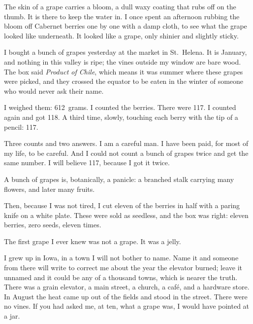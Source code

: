 \bigskip

The skin of a grape carries a bloom, a dull waxy coating that rubs off on
the thumb. It is there to keep the water in. I once spent an afternoon
rubbing the bloom off Cabernet berries one by one with a damp cloth, to see
what the grape looked like underneath. It looked like a grape, only shinier
and slightly sticky.

I bought a bunch of grapes yesterday at the market in St.~Helena. It is
January, and nothing in this valley is ripe; the vines outside my window are
bare wood. The box said \emph{Product of Chile}, which means it was summer
where these grapes were picked, and they crossed the equator to be eaten in
the winter of someone who would never ask their name.%

I weighed them: 612~grams. I counted the berries. There were 117. I counted
again and got 118. A third time, slowly, touching each berry with the tip of
a pencil: 117.

Three counts and two answers. I am a careful man. I have
been paid, for most of my life, to be careful. And I could not count a bunch
of grapes twice and get the same number. I will believe 117, because I got
it twice.

A bunch of grapes is, botanically, a panicle: a branched stalk carrying
many flowers, and later many fruits.%

Then, because I was not tired, I cut eleven of the berries in half with a
paring knife on a white plate. These were sold as seedless, and the box was
right: eleven berries, zero seeds, eleven times.

\bigskip

The first grape I ever knew was not a grape. It was a jelly.

I grew up in Iowa, in a town I will not bother to name. Name it and someone
from there will write to correct me about the year the elevator burned;
leave it unnamed and it could be any of a thousand towns, which is nearer
the truth. There was a grain elevator, a main street, a church, a caf\'e,
and a hardware store. In August the heat came up out of the fields and stood
in the street. There were no vines. If you had asked me, at ten, what a
grape was, I would have pointed at a jar.

